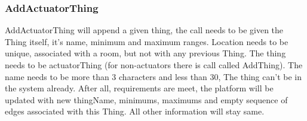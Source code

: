 \documentclass{article}
\newcommand{\same}[1]{\\{#1}'={#1}}
\newcommand{\sameObvious}[1]{\same{rooms}\same{allThings}\same{noiseThings}\same{tempThings}\same{lightThings}\same{actuatorThings}  }
\begin{document}
\subsubsection{AddActuatorThing}
AddActuatorThing will append a given thing, the call needs to be given the Thing itself, it's name, minimum and maximum ranges. Location needs to be unique, associated with a room, but not with any previous Thing. The thing needs to be actuatorThing (for non-actuators there is call called  AddThing). The name needs to be more than 3 characters and less than 30, The thing can't be in the system already. After all, requirements are meet, the platform will be updated with new thingName, minimums, maximums and empty sequence  of edges associated with this Thing. All other information will stay same.




\newpage
\label{toc:AddData}
\end{document}
